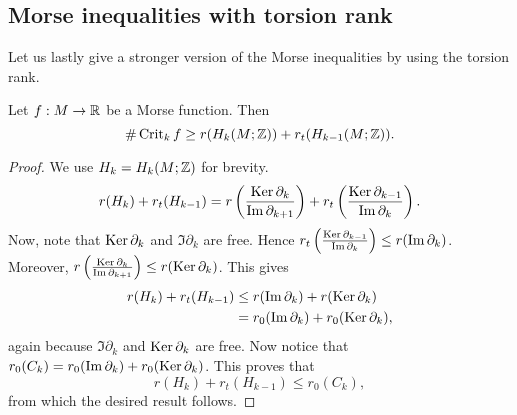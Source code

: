 \subsection{Morse inequalities with torsion rank}

Let us lastly give a stronger version of the Morse inequalities by using the torsion rank.
\begin{theorem}
    Let $f: M \to  \mathbb{R}$ be a Morse function.
    Then
    \[
    \# \operatorname{Crit}_k f \ge r( H_k(M; \mathbb{Z})) + r_t(H_{k-1}(M; \mathbb{Z})).
\]
\end{theorem}
\begin{proof}
    We use $H_k = H_k(M; \mathbb{Z})$ for brevity.
    \begin{align*}
        r(H_k) + r_t(H_{k-1}) = r\left( \frac{\operatorname{Ker} \partial_k}{\operatorname{Im} \partial_{k+1}} \right) + r_t \left( \frac{\operatorname{Ker} \partial_{k-1}}{\operatorname{Im} \partial_k} \right) 
    .\end{align*}
    Now, note that $\operatorname{Ker} \partial_k$ and $\Im \partial_k$ are free. Hence $r_t\left(\frac{\operatorname{Ker} \partial_{k-1}}{\operatorname{Im} \partial_k}\right)\le  r (\operatorname{Im} \partial_k)$.
    Moreover, $r\left( \frac{\operatorname{Ker} \partial_k}{\operatorname{Im} \partial_{k+1}} \right) \le r(\operatorname{Ker} \partial_k)$.
    This gives
    \begin{align*}
        r(H_k) + r_t(H_{k-1})  &\le  r(\operatorname{Im} \partial_k) + r (\operatorname{Ker} \partial_k)\\
                               &= r_0(\operatorname{Im} \partial_k) + r_0 (\operatorname{Ker} \partial_k),
    \end{align*} 
    again because $\Im \partial_k $ and  $\operatorname{Ker} \partial_k$ are free.
    Now notice that $r_0(C_k) = r_0(\operatorname{Im} \partial_k) + r_0(\operatorname{Ker} \partial_k)$.
    This proves that
    \[
        r(H_k) + r_t(H_{k-1}) \le  r_0 (C_k)
    ,\] 
    from which the desired result follows.
\end{proof}


